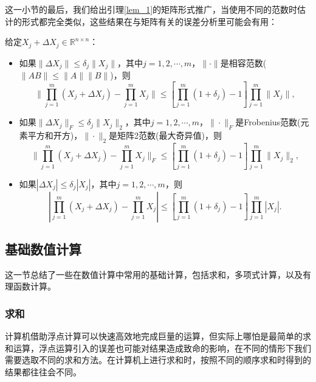\documentclass[a4paper,10pt]{ctexart}
\begin{document}
这一小节的最后，我们给出引理\ref{lem_1}的矩阵形式推广，当使用不同的范数时估计的形式都完全类似，这些结果在与矩阵有关的误差分析里可能会有用：
\begin{lemma}
    给定$ X_j+\Delta X_j\in \mathbb{R}^{n\times n} $：
    \begin{itemize}
        \item 如果$ \| \Delta X_j \| \leqslant \delta_j \| X_j \| $，其中$ j=1,2,\cdots, m $，$ \| \cdot \| $是相容范数($ \| AB \|\leqslant \| A \|\| B \| $)，则
        \begin{equation}
            \| \prod_{j=1}^m (X_j +\Delta X_j)-\prod_{j=1}^m X_j \| \leqslant \left[ \prod_{j=1}^m(1+\delta_j)-1 \right] \prod_{j=1}^m \| X_j \|,
        \end{equation}
        \item 如果$ \| \Delta X_j \|_F \leqslant \delta_j \| X_j \|_2 $，其中$ j=1,2,\cdots, m $，$ \| \cdot \|_F $是Frobenius范数(元素平方和开方)，$ \| \cdot \|_2 $是矩阵2范数(最大奇异值)，则
        \begin{equation}
            \| \prod_{j=1}^m (X_j +\Delta X_j)-\prod_{j=1}^m X_j \|_{F} \leqslant \left[ \prod_{j=1}^m(1+\delta_j)-1 \right] \prod_{j=1}^m \| X_j \|_2,
        \end{equation}
        \item 如果$ | \Delta X_j | \leqslant \delta_j | X_j | $，其中$ j=1,2,\cdots, m $，则
        \begin{equation}
            | \prod_{j=1}^m (X_j +\Delta X_j)-\prod_{j=1}^m X_j | \leqslant \left[ \prod_{j=1}^m(1+\delta_j)-1 \right] \prod_{j=1}^m | X_j |.
        \end{equation}
    \end{itemize}
\end{lemma}

\subsection{基础数值计算}
这一节总结了一些在数值计算中常用的基础计算，包括求和，多项式计算，以及有理函数计算。
\subsubsection{求和}
计算机借助浮点计算可以快速高效地完成巨量的运算，但实际上哪怕是最简单的求和运算，浮点运算引入的误差也可能对结果造成致命的影响，在不同的情形下我们需要选取不同的求和方法。在计算机上进行求和时，按照不同的顺序求和时得到的结果都往往会不同。
\end{document}
